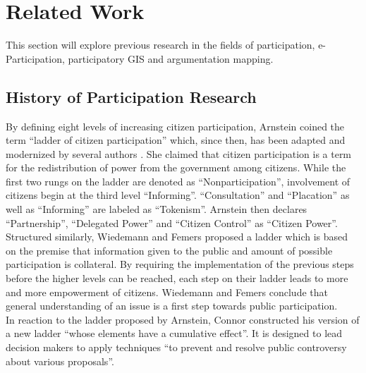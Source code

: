 \section{Related Work}
\label{chap:related_work}
This section will explore previous research in the fields of participation, e-Participation, participatory GIS and argumentation mapping.%



\subsection{History of Participation Research}
By defining eight levels of increasing citizen participation, Arnstein \cite{Arnstein1969_citizen_participation} coined the term ``ladder of citizen participation'' which, since then, has been adapted and modernized by several authors \cite{Connor1988_new_ladder,carver2003future,Collins2009_social_learning,you2009_participatory_map_based,Cai2009_spatial_annotation_deliberation,Macintosh2004_eParticipation_characterization,Schlossberg2005_PPGIS}. She claimed that citizen participation is a term for the redistribution of power from the government among citizens. While the first two rungs on the ladder are denoted as ``Nonparticipation'', involvement of citizens begin at the third level ``Informing''. ``Consultation'' and ``Placation'' as well as ``Informing'' are labeled as ``Tokenism''. Arnstein then declares ``Partnership'', ``Delegated Power'' and ``Citizen Control'' as ``Citizen Power''.\\
Structured similarly, Wiedemann and Femers \cite{Wiedemann1993355} proposed a ladder which is based on the premise that information given to the public and amount of possible participation is collateral. By requiring the implementation of the previous steps before the higher levels can be reached, each step on their ladder leads to more and more empowerment of citizens. Wiedemann and Femers conclude that general understanding of an issue is a first step towards public participation.\\
In reaction to the ladder proposed by Arnstein, Connor \cite{Connor1988_new_ladder} constructed his version of a new ladder ``whose elements have a cumulative effect''. It is designed to lead decision makers to apply techniques ``to prevent and resolve public controversy about various proposals''. %

